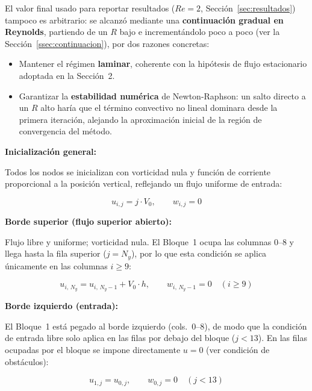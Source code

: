 \documentclass[12pt, a4paper]{article}
\begin{document}
El valor final usado para reportar resultados ($Re = 2$,
Sección~\ref{sec:resultados}) tampoco es arbitrario: se alcanzó mediante una
\textbf{continuación gradual en Reynolds}, partiendo de un $R$ bajo e
incrementándolo poco a poco (ver la Sección~\ref{ssec:continuacion}), por dos
razones concretas:
\begin{itemize}
  \item Mantener el régimen \textbf{laminar}, coherente con la hipótesis de
        flujo estacionario adoptada en la Sección~2.
  \item Garantizar la \textbf{estabilidad numérica} de Newton-Raphson: un
        salto directo a un $R$ alto haría que el término convectivo no
        lineal dominara desde la primera iteración, alejando la
        aproximación inicial de la región de convergencia del método.
\end{itemize}

\bigskip
\noindent\textbf{Inicialización general:}

Todos los nodos se inicializan con vorticidad nula y función de corriente
proporcional a la posición vertical, reflejando un flujo uniforme de entrada:

\begin{equation}
  u_{i,j} = j\cdot V_{0}, \qquad w_{i,j} = 0
\end{equation}

\bigskip
\noindent\textbf{Borde superior (flujo superior abierto):}

Flujo libre y uniforme; vorticidad nula. El Bloque~1 ocupa las columnas 0--8 y
llega hasta la fila superior ($j = N_y$), por lo que esta condición se aplica
únicamente en las columnas $i \geq 9$:

\begin{equation}
  u_{i,\,N_y} = u_{i,\,N_y-1} + V_{0}\cdot h, \qquad
  w_{i,\,N_y-1} = 0 \quad (i \geq 9)
\end{equation}

\bigskip
\noindent\textbf{Borde izquierdo (entrada):}

El Bloque~1 está pegado al borde izquierdo (cols.\ 0--8), de modo que la
condición de entrada libre solo aplica en las filas por debajo del bloque
($j < 13$). En las filas ocupadas por el bloque se impone directamente
$u = 0$ (ver condición de obstáculos):

\begin{equation}
  u_{1,j} = u_{0,j}, \qquad w_{0,j} = 0 \quad (j < 13)
\end{equation}
\end{document}

